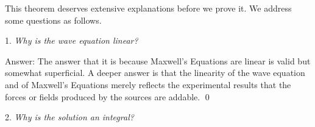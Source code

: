 \documentclass[11pt]{article}              %
\begin{document}
This theorem deserves extensive explanations before we prove it. We address some questions as follows.

1. {\it Why is the wave equation linear?}

Answer: The answer that it is because Maxwell's Equations are linear is valid but somewhat superficial. A deeper answer is that the linearity of the wave equation and of Maxwell's Equations merely reflects the experimental results that the forces or fields produced by the sources are addable. 
\qed

2. {\it Why is the solution an integral?} 




\end{document}
